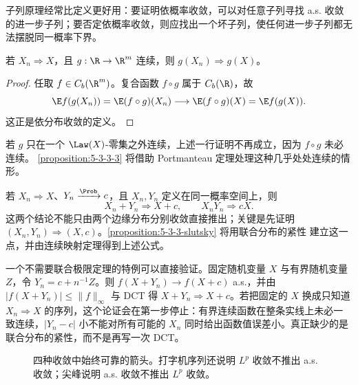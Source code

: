 子列原理经常比定义更好用：要证明依概率收敛，可以对任意子列寻找 a.s. 收敛的进一步子列；要否定依概率收敛，则应找出一个坏子列，使任何进一步子列都无法摆脱同一概率下界。

\begin{theorem}\label{theorem:5-3-1-3}
若 $X_n\Rightarrow X$，且 $g:\R\to\R^m$ 连续，则
$g(X_n)\Rightarrow g(X)$。
\end{theorem}

\begin{proof}
任取 $f\in C_b(\R^m)$。复合函数 $f\circ g$ 属于 $C_b(\R)$，故
\[
 \E f(g(X_n))=\E (f\circ g)(X_n)\longrightarrow
 \E(f\circ g)(X)=\E f(g(X)).
\]
这正是依分布收敛的定义。
\end{proof}

若 $g$ 只在一个 $\Law(X)$-零集之外连续，上述一行证明不再成立，因为 $f\circ g$ 未必连续。
\cref{proposition:5-3-3-3} 将借助 Portmanteau 定理处理这种几乎处处连续的情形。

\begin{remark}\label{proposition:5-3-1-4}
若 $X_n\Rightarrow X$、$Y_n\xrightarrow{\Prob}c$，且 $X_n,Y_n$ 定义在同一概率空间上，则
\[
 X_n+Y_n\Rightarrow X+c,
 \qquad
 X_nY_n\Rightarrow cX.
\]
这两个结论不能只由两个边缘分布分别收敛直接推出；关键是先证明
$(X_n,Y_n)\Rightarrow(X,c)$。\cref{proposition:5-3-3-slutsky} 将用联合分布的紧性
建立这一点，并由连续映射定理得到上述公式。
\end{remark}

一个不需要联合极限定理的特例可以直接验证。固定随机变量 $X$ 与有界随机变量 $Z$，令
$Y_n=c+n^{-1}Z$。则 $f(X+Y_n)\to f(X+c)$ a.s.，并由 $|f(X+Y_n)|\le\|f\|_\infty$ 与 DCT 得
$X+Y_n\Rightarrow X+c$。若把固定的 $X$ 换成只知道 $X_n\Rightarrow X$ 的序列，这个论证会在第一步停止：有界连续函数在整条实线上未必一致连续，$|Y_n-c|$ 小不能对所有可能的 $X_n$ 同时给出函数值误差小。真正缺少的是联合分布的紧性，而不是再写一次 DCT。

\begin{figure}[htbp]
\centering
{}
\caption{四种收敛中始终可靠的箭头。打字机序列还说明 $L^p$ 收敛不推出 a.s. 收敛；尖峰说明 a.s. 收敛不推出 $L^p$ 收敛。}
\label{fig:5-3-1-convergence-map}
\end{figure}

